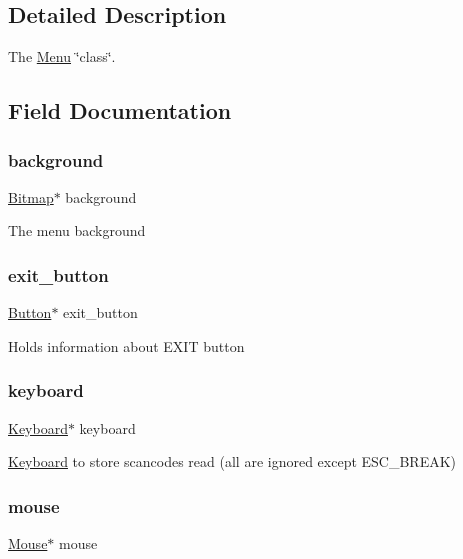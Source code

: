 \subsection{Detailed Description}
The \hyperlink{struct_menu}{Menu} \char`\"{}class\char`\"{}. 

\subsection{Field Documentation}
\hypertarget{struct_menu_a15de70574bc710486bf129a5c8f1634e}{}\label{struct_menu_a15de70574bc710486bf129a5c8f1634e} 
\subsubsection{\texorpdfstring{background}{background}}
{\footnotesize\ttfamily \hyperlink{struct_bitmap}{Bitmap}$\ast$ background}

The menu background \hypertarget{struct_menu_a173a61ec5be315a84389cc08d3852abe}{}\label{struct_menu_a173a61ec5be315a84389cc08d3852abe} 
\subsubsection{\texorpdfstring{exit\+\_\+button}{exit\_button}}
{\footnotesize\ttfamily \hyperlink{struct_button}{Button}$\ast$ exit\+\_\+button}

Holds information about E\+X\+IT button \hypertarget{struct_menu_a945ceeb6236fbaf00dcdb7a0109f0d40}{}\label{struct_menu_a945ceeb6236fbaf00dcdb7a0109f0d40} 
\subsubsection{\texorpdfstring{keyboard}{keyboard}}
{\footnotesize\ttfamily \hyperlink{struct_keyboard}{Keyboard}$\ast$ keyboard}

\hyperlink{struct_keyboard}{Keyboard} to store scancodes read (all are ignored except E\+S\+C\+\_\+\+B\+R\+E\+AK) \hypertarget{struct_menu_a2514b83cbae6998a57eae74a24f6faf4}{}\label{struct_menu_a2514b83cbae6998a57eae74a24f6faf4} 
\subsubsection{\texorpdfstring{mouse}{mouse}}
{\footnotesize\ttfamily \hyperlink{struct_mouse}{Mouse}$\ast$ mouse}


